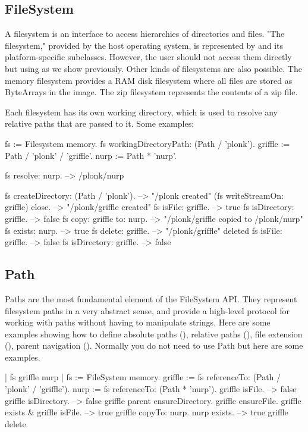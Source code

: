 \documentclass[a4paper,10pt,twoside]{book}
\begin{document}
\subsection{FileSystem}

A filesystem is an interface to access hierarchies of directories and files. "The filesystem," provided by the host operating system, is represented by  and its platform-specific subclasses. However, the user should not access them directly but using  as we show previously. Other kinds of filesystems are also possible. The memory filesystem provides a RAM disk filesystem where all files are stored as ByteArrays in the image. The zip filesystem represents the contents of a zip file.

Each filesystem has its own working directory, which is used to resolve any relative paths that are passed to it. Some examples:

\begin{code}{}
fs := Filesystem memory.
fs workingDirectoryPath: (Path / 'plonk').
griffle := Path / 'plonk' / 'griffle'.
nurp := Path * 'nurp'.
    
fs resolve: nurp.            --> /plonk/nurp
    
fs createDirectory: (Path / 'plonk').  --> "/plonk created"
(fs writeStreamOn: griffle) close.  --> "/plonk/griffle created"
fs isFile: griffle.         --> true
fs isDirectory: griffle.         --> false
fs copy: griffle to: nurp.       --> "/plonk/griffle copied to /plonk/nurp"
fs exists: nurp.             --> true
fs delete: griffle.          --> "/plonk/griffle" deleted
fs isFile: griffle.          --> false
fs isDirectory: griffle.         --> false
\end{code}
	

\subsection{Path}
Paths are the most fundamental element of the FileSystem API. They represent filesystem paths in a very abstract sense, and provide a high-level protocol for working with paths without having to manipulate strings. Here are some examples showing how to 
define absolute paths (), relative paths (), file extension (), parent navigation ().
Normally you do not need to use Path but here are some examples.

\begin{code}{}
| fs griffle nurp | 
fs := FileSystem memory.
griffle := fs referenceTo: (Path / 'plonk' / 'griffle').
nurp := fs referenceTo: (Path * 'nurp').
griffle isFile.	
    --> false			
griffle isDirectory. 		
    --> false		
griffle parent ensureDirectory.
griffle ensureFile.
griffle exists & griffle isFile.		
    --> true
griffle copyTo: nurp.
nurp exists.			
    --> true	
griffle delete       
\end{code}    
\end{document}
